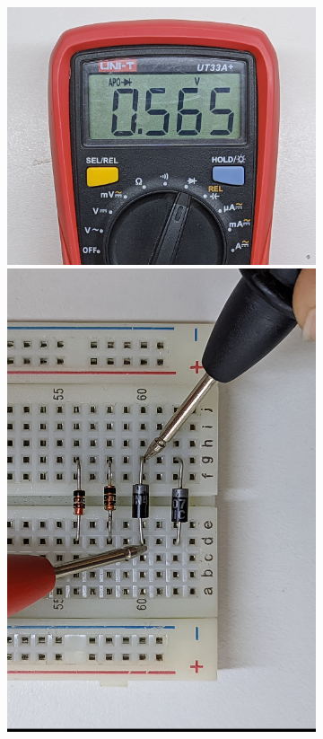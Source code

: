 \documentclass[chaptersright]{informeutn}
\begin{document}
\begin{figure}[!ht]
\begin{subfigure}[b]{1\textwidth}
\begin{minipage}[b]{0.24\textwidth}
          \includegraphics[width=1\textwidth]{pictures/mult_diod-1d.jpg}
        \end{minipage}
        \begin{minipage}[b]{0.24\textwidth}
          \centering
          \includegraphics[angle=-90, width=1\textwidth]{pictures/prot_diod-2d.jpg}

\end{minipage}
\end{subfigure}
\end{figure}
\end{document}
